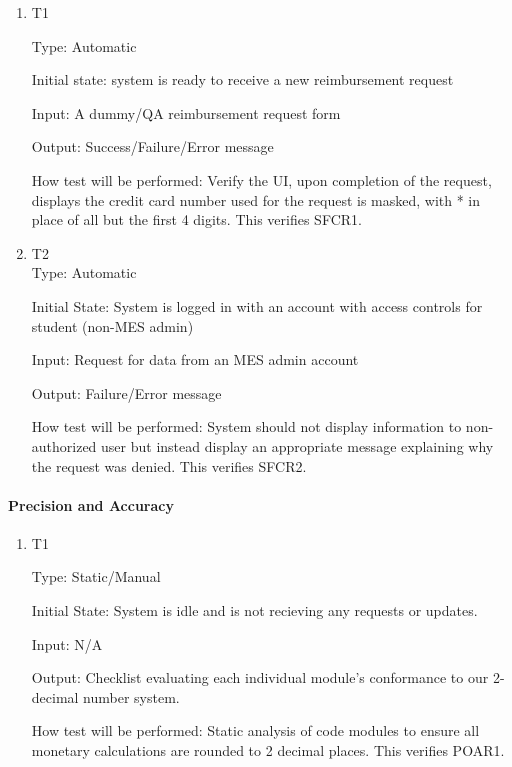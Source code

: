 \documentclass[12pt, titlepage]{article}
\begin{document}
\begin{enumerate}

\item{T1\\}
\hypertarget{NFR12.2-TC1}{}

Type: Automatic

Initial state: system is ready to receive a new reimbursement request

Input: A dummy/QA reimbursement request form

Output: Success/Failure/Error message

How test will be performed: Verify the UI, upon completion of the request, displays the credit card number used for the request is masked, with * in place of all but the first 4 digits. This verifies SFCR1.

\item{T2\\}
\hypertarget{NFR12.2-TC2}{}
Type: Automatic 

Initial State: System is logged in with an account with access controls for student (non-MES admin)

Input: Request for data from an MES admin account

Output: Failure/Error message

How test will be performed: System should not display information to non-authorized user but instead display an appropriate message explaining why the request was denied. This verifies SFCR2.
\end{enumerate}

\paragraph{Precision and Accuracy}

\begin{enumerate}
\item{T1\\}
\hypertarget{NFR12.3-TC1}{}

Type: Static/Manual 

Initial State: System is idle and is not recieving any requests or updates.

Input: N/A

Output: Checklist evaluating each individual module's conformance to our 2-decimal number system.

How test will be performed: Static analysis of code modules to ensure all monetary calculations are rounded to 2 decimal places. This verifies POAR1.
\end{enumerate}
\end{document}
